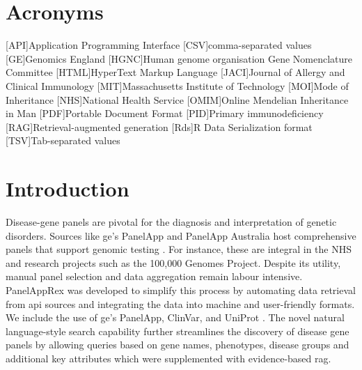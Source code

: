 \section*{Acronyms}
\renewenvironment{description} %
{\list{}{\labelwidth0pt\itemindent-\leftmargin
    \parsep-1em\itemsep0pt\let\makelabel\descriptionlabel}}
               {\endlist}
\begin{acronym} 
[API]{Application Programming Interface}
[CSV]{comma-separated values}
[GE]{Genomics England}
[HGNC]{Human genome organisation Gene Nomenclature Committee}
[HTML]{HyperText Markup Language}
[JACI]{Journal of Allergy and Clinical Immunology}
[MIT]{Massachusetts Institute of Technology}
[MOI]{Mode of Inheritance}
[NHS]{National Health Service}
[OMIM]{Online Mendelian Inheritance in Man}
[PDF]{Portable Document Format}
[PID]{Primary immunodeficiency}
[RAG]{Retrieval-augmented generation}
[Rds]{R Data Serialization format}
[TSV]{Tab-separated values}
\end{acronym} 
 

\section{Introduction}
\noindent
Disease-gene panels are pivotal for the diagnosis and interpretation of genetic disorders. Sources like \ac{ge}’s PanelApp and PanelApp Australia host comprehensive panels that support genomic testing \cite{martin_panelapp_2019}. 
For instance, these are integral in the NHS and research projects such as the 100,000 Genomes Project\cite{martin_panelapp_2019}. Despite its utility, manual panel selection and data aggregation remain labour intensive. PanelAppRex was developed to simplify this process by automating data retrieval from \ac{api} sources and integrating the data into machine and user-friendly formats. We include the use of \ac{ge}’s PanelApp, ClinVar, and UniProt
\cite{martin_panelapp_2019,
landrum_clinvar_2018, the_uniprot_consortium_uniprot_2025}. 
The novel natural language-style search capability further streamlines the discovery of disease gene panels by allowing queries based on gene names, phenotypes, disease groups and additional key attributes which were supplemented with evidence-based \ac{rag}.


